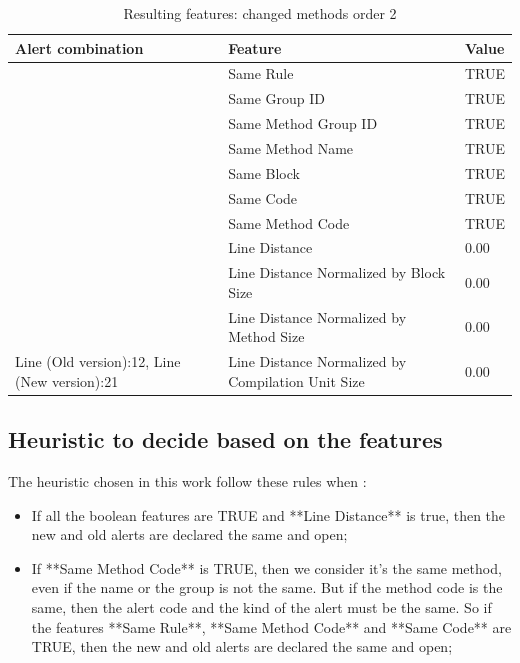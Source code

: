 \documentclass[
]{article}
\begin{document}
\begin{table}[!h]

\caption{\label{tab:unnamed-chunk-24}Resulting features: changed methods order 2 \label{changing_method_order_2} }
\centering
\begin{tabular}[t]{l|l|l}
\hline
Alert combination & Feature & Value\\
\hline
\rowcolor{gray!6}   & Same Rule & TRUE\\

 & Same Group ID & TRUE\\

\rowcolor{gray!6}   & Same Method Group ID & TRUE\\

 & Same Method Name & TRUE\\

\rowcolor{gray!6}   & Same Block & TRUE\\

 & Same Code & TRUE\\

\rowcolor{gray!6}   & Same Method Code & TRUE\\

 & Line Distance & 0.00\\

\rowcolor{gray!6}   & Line Distance Normalized by Block Size & 0.00\\

 & Line Distance Normalized by Method Size & 0.00\\

\multirow[t]{-11}{*}{\raggedright\arraybackslash Line (Old version):12, Line (New version):21} & Line Distance Normalized by Compilation Unit Size & 0.00\\
\hline
\end{tabular}
\end{table}

\normalsize

\subsection{Heuristic to decide based on the features}\label{heuristic}

The heuristic chosen in this work follow these rules when :

\begin{itemize}
\item If all the boolean features are TRUE and **Line Distance** is true, then the new and old alerts are declared the same and open;
\item If **Same Method Code** is TRUE, then we consider it's the same method, even if the name or the group is not the same. But if the method code is the same, then the alert code and the kind of the alert must be the same. So if the features **Same Rule**, **Same Method Code** and 
**Same Code** are TRUE, then the new and old alerts are declared the same and open;
\end{itemize}
\end{document}

